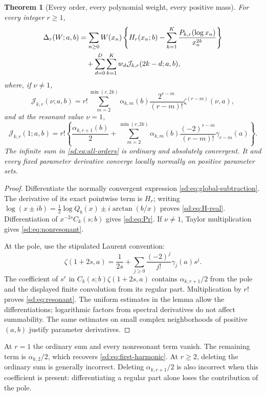\documentclass[11pt,a4paper]{article}
\numberwithin{equation}{section}
\newtheorem{theorem}{Theorem}[section]
\theoremstyle{definition}
\theoremstyle{remark}
\begin{document}
\begin{theorem}[Every order, every polynomial weight, every positive mass]
\label{sd:thm:all-orders}
For every integer $r\ge1$,
\begin{align}
 \Delta_r(W;a,b)
 &=\sum_{n\ge0}W(x_n)
       \left\{H_r(x_n;b)-\sum_{k=1}^{K}
                    \frac{P_{k,r}(\log x_n)}{x_n^{2k}}\right\}
       \notag\\
 &\quad+\sum_{d=0}^{D}\sum_{k=1}^{K}w_d\mathcal J_{k,r}(2k-d;a,b),
       \label{sd:eq:all-orders}
\end{align}
where, if $\nu\ne1$,
\begin{equation}\label{sd:eq:nonresonant}
 \mathcal J_{k,r}(\nu;a,b)=r!\sum_{m=2}^{\min(r,2k)}
   \alpha_{k,m}(b)\frac{2^{r-m}}{(r-m)!}
                       \zeta^{(r-m)}(\nu,a),
\end{equation}
and at the resonant value $\nu=1$,
\begin{equation}\label{sd:eq:resonant}
 \boxed{\displaystyle
 \mathcal J_{k,r}(1;a,b)=r!\left\{
   \frac{\alpha_{k,r+1}(b)}2+
   \sum_{m=2}^{\min(r,2k)}\alpha_{k,m}(b)
          \frac{(-2)^{r-m}}{(r-m)!}\gamma_{r-m}(a)\right\}.}
\end{equation}
The infinite sum in \eqref{sd:eq:all-orders} is ordinary and absolutely
convergent.  It and every fixed parameter derivative converge locally
normally on positive parameter sets.
\end{theorem}
\begin{proof}
Differentiate the normally convergent expression
\eqref{sd:eq:global-subtraction}.  The derivative of its exact pointwise
term is $H_r$; writing
$\log(x\pm ib)=\frac12\log Q_b(x)\pm i\arctan(b/x)$ proves
\eqref{sd:eq:H-real}.  Differentiation of $x^{-2s}C_k(s;b)$ gives
\eqref{sd:eq:Pr}.  If $\nu\ne1$, Taylor multiplication gives
\eqref{sd:eq:nonresonant}.

At the pole, use the stipulated Laurent convention:
\[
 \zeta(1+2s,a)=\frac1{2s}
       +\sum_{j\ge0}\frac{(-2)^j}{j!}\gamma_j(a)s^j.
\]
The coefficient of $s^r$ in $C_k(s;b)\zeta(1+2s,a)$ contains
$\alpha_{k,r+1}/2$ from the pole and the displayed finite convolution
from its regular part.  Multiplication by $r!$ proves
\eqref{sd:eq:resonant}.  The uniform estimates in the lemma allow
the differentiations; logarithmic factors from spectral derivatives
do not affect summability.  The same estimates on small complex
neighborhoods of positive $(a,b)$ justify parameter derivatives.
\end{proof}

At $r=1$ the ordinary sum and every nonresonant term vanish.  The
remaining term is $\alpha_{k,2}/2$, which recovers
\eqref{sd:eq:first-harmonic}.  At $r\ge2$, deleting the ordinary sum
is generally incorrect.  Deleting $\alpha_{k,r+1}/2$ is also
incorrect when this coefficient is present: differentiating a regular
part alone loses the contribution of the pole.
\end{document}
